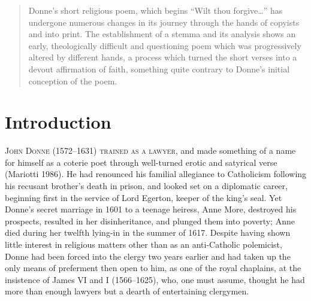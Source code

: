 
\begin{paper}



\begin{abstract}
Donne’s short religious poem, which begins ``Wilt thou forgive\ldots{}'' has undergone numerous changes in its journey through the hands of copyists and into print.  The establishment of a stemma and its analysis shows an early, theologically difficult and questioning poem which was progressively altered by different hands, a process which turned the short verses into a devout affirmation of faith, something quite contrary to Donne’s initial conception of the poem.
\end{abstract}

\section{Introduction} 

\textsc{John Donne (1572--1631) trained as a lawyer,} and made something of a
name for himself as a coterie poet through well-turned erotic and
satyrical verse (Mariotti 1986). He had renounced his familial
allegiance to Catholicism following his recusant brother's death in
prison, and looked set on a diplomatic career, beginning first in the
service of Lord Egerton, keeper of the king's seal. Yet Donne's secret
marriage in 1601 to a teenage heiress, Anne More, destroyed his
prospects, resulted in her disinheritance, and plunged them into
poverty; Anne died during her twelfth lying-in in the summer of
1617. Despite having shown little interest in religious matters other
than as an anti-Catholic polemicist, Donne had been forced into the
clergy two years earlier and had taken up the only means of preferment
then open to him, as one of the royal chaplains, at the insistence of
James VI and I (1566--1625), who, one must assume, thought he had more
than enough lawyers but a dearth of entertaining clergymen.


\end{paper}
